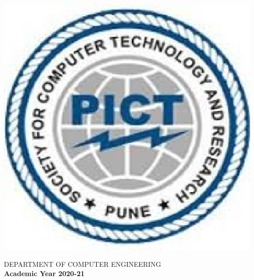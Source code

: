 \documentclass[a4paper, 12pt]{article}
\begin{document}
\begin{titlepage}
\begin{center}
        \includegraphics[scale=0.6]{./pict}   
        
        \Large
        DEPARTMENT OF COMPUTER ENGINEERING\\
		\textbf{Academic Year 2020-21}
        
    \end{center}
\end{titlepage}
\pagebreak
\end{document}
